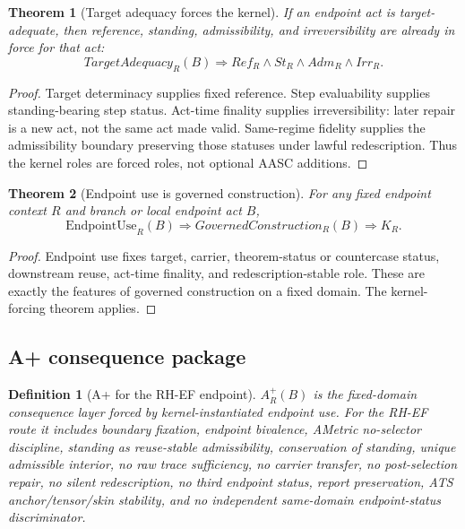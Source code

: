 \documentclass[11pt]{article}
\newtheorem{definition}{Definition}[section]
\newtheorem{theorem}{Theorem}[section]
\newcommand{\EndpointUse}{\mathrm{EndpointUse}}
\newcommand{\Aplus}{A^+}
\begin{document}
\begin{theorem}[Target adequacy forces the kernel]
If an endpoint act is target-adequate, then reference, standing, admissibility, and irreversibility are already in force for that act:
\[
TargetAdequacy_R(B)\Rightarrow Ref_R\wedge St_R\wedge Adm_R\wedge Irr_R.
\]
\end{theorem}

\begin{proof}
Target determinacy supplies fixed reference.  Step evaluability supplies standing-bearing step status.  Act-time finality supplies irreversibility: later repair is a new act, not the same act made valid.  Same-regime fidelity supplies the admissibility boundary preserving those statuses under lawful redescription.  Thus the kernel roles are forced roles, not optional AASC additions.
\end{proof}

\begin{theorem}[Endpoint use is governed construction]
For any fixed endpoint context \(R\) and branch or local endpoint act \(B\),
\[
\EndpointUse_R(B)\Rightarrow GovernedConstruction_R(B)\Rightarrow K_R.
\]
\end{theorem}

\begin{proof}
Endpoint use fixes target, carrier, theorem-status or countercase status, downstream reuse, act-time finality, and redescription-stable role.  These are exactly the features of governed construction on a fixed domain.  The kernel-forcing theorem applies.
\end{proof}

\subsection{A+ consequence package}

\begin{definition}[A+ for the RH-EF endpoint]
\(\Aplus_R(B)\) is the fixed-domain consequence layer forced by kernel-instantiated endpoint use.  For the RH-EF route it includes boundary fixation, endpoint bivalence, AMetric no-selector discipline, standing as reuse-stable admissibility, conservation of standing, unique admissible interior, no raw trace sufficiency, no carrier transfer, no post-selection repair, no silent redescription, no third endpoint status, report preservation, ATS anchor/tensor/skin stability, and no independent same-domain endpoint-status discriminator.
\end{definition}
\end{document}
